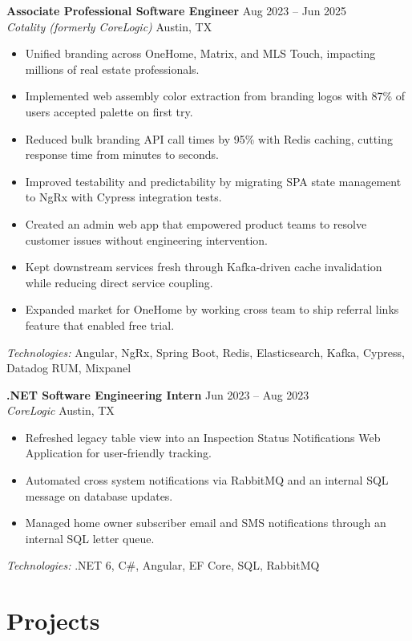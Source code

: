 \documentclass[letterpaper,10pt]{article}
\begin{document}
\textbf{Associate Professional Software Engineer} \hfill Aug 2023 -- Jun 2025\\
\textit{Cotality (formerly CoreLogic)} \hfill Austin, TX
\begin{itemize}
  \item Unified branding across OneHome, Matrix, and MLS Touch, impacting millions of real estate professionals.
  \item Implemented web assembly color extraction from branding logos with 87\% of users accepted palette on first try.
  \item Reduced bulk branding API call times by 95\% with Redis caching, cutting response time from minutes to seconds.
  \item Improved testability and predictability by migrating SPA state management to NgRx with Cypress integration tests.
  \item Created an admin web app that empowered product teams to resolve customer issues without engineering intervention.
  \item Kept downstream services fresh through Kafka-driven cache invalidation while reducing direct service coupling.
  \item Expanded market for OneHome by working cross team to ship referral links feature that enabled free trial.
\end{itemize}
\textit{Technologies:} Angular, NgRx, Spring Boot, Redis, Elasticsearch, Kafka, Cypress, Datadog RUM, Mixpanel

\textbf{.NET Software Engineering Intern} \hfill Jun 2023 -- Aug 2023\\
\textit{CoreLogic} \hfill Austin, TX
\begin{itemize}
  \item Refreshed legacy table view into an Inspection Status Notifications Web Application for user-friendly tracking.
  \item Automated cross system notifications via RabbitMQ and an internal SQL message on database updates.
  \item Managed home owner subscriber email and SMS notifications through an internal SQL letter queue.
\end{itemize}
\textit{Technologies:} .NET 6, C\#, Angular, EF Core, SQL, RabbitMQ

\section*{Projects}
\end{document}
